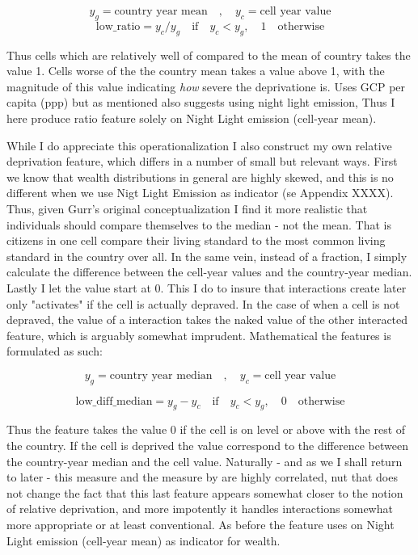 \documentclass[a4paper]{article}
\begin{document}
$$y_g = \textrm{country year mean}\quad ,\quad  y_c = \textrm{cell year value}$$
$$\textrm{low\_ratio} = y_c/y_g  \quad \textrm{if} \quad y_c < y_g, \quad 1 \quad \textrm{otherwise}$$

Thus cells which are relatively well of compared to the mean of country takes the value 1. Cells worse of the the country mean takes a value above 1, with the magnitude of this value indicating \emph{how} severe the deprivatione is. \cite{Cederman_Gleditsch_Buhaug_2013} Uses GCP per capita (ppp) but as mentioned also suggests using night light emission, Thus I here produce ratio feature solely on Night Light emission (cell-year mean).\par

While I do appreciate this operationalization I also construct my own relative deprivation feature, which differs in a number of small but relevant ways. First we know that wealth distributions in general are highly skewed, and this is no different when we use Nigt Light Emission as indicator (se Appendix XXXX). Thus, given Gurr's original conceptualization I find it more realistic that individuals should compare themselves to the median - not the mean. That is citizens in one cell compare their living standard to the most common living standard in the country over all. In the same vein, instead of a fraction, I simply calculate the difference between the cell-year values and the country-year median. Lastly I let the value start at 0. This I do to insure that interactions create later only "activates" if the cell is actually depraved. In the case of \cite{Cederman_Gleditsch_Buhaug_2013} when a cell is not depraved, the value of a interaction takes the naked value of the other interacted feature, which is arguably somewhat imprudent. Mathematical the features is formulated as such:\par

$$y_g = \textrm{country year median}\quad ,\quad  y_c = \textrm{cell year value}$$

$$\textrm{low\_diff\_median} = y_g - y_c  \quad \textrm{if} \quad y_c < y_g, \quad 0 \quad \textrm{otherwise}$$

Thus the feature takes the value 0 if the cell is on level or above with the rest of the country. If the cell is deprived the value correspond to the difference between the country-year median and the cell value. Naturally - and as we I shall return to later - this measure and the measure by \cite{Cederman_Weidmann_Gleditsch_2011} are highly correlated, nut that does not change the fact that this last feature appears somewhat closer to the notion of relative deprivation, and more impotently it handles interactions somewhat more appropriate or at least conventional. As before the feature uses on Night Light emission (cell-year mean) as indicator for wealth.\par
\end{document}
